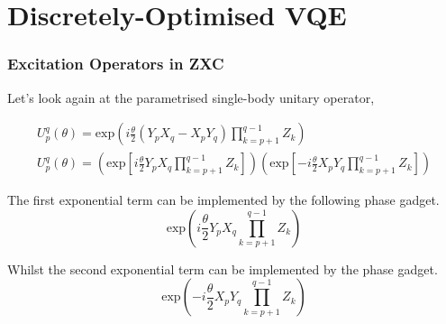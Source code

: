 \section{Discretely-Optimised VQE}

\subsubsection{Excitation Operators in ZXC}

Let's look again at the parametrised single-body unitary operator,

\begin{equation*}
\begin{gathered}
    U^q_p (\theta) =
    \text{exp} \left( i
    \frac{\theta}{2} (Y_p X_q - X_p Y_q) \prod_{k=p+1}^{q-1} Z_k \right) \\
    U^q_p (\theta) =
    \left( \text{exp} \left[
    i \frac{\theta}{2} Y_p X_q \prod_{k=p+1}^{q-1} Z_k \right] \right)
    \left( \text{exp} \left[ -
    i \frac{\theta}{2} X_p Y_q \prod_{k=p+1}^{q-1} Z_k \right] \right)
\end{gathered}
\end{equation*}

The first exponential term can be implemented by the following phase gadget.
\begin{equation*}
    \text{exp} \left( i
    \frac{\theta}{2} Y_p X_q \prod_{k=p+1}^{q-1} Z_k \right)
\end{equation*}





Whilst the second exponential term can be implemented by the phase gadget.
\begin{equation*}
    \text{exp} \left( - i
    \frac{\theta}{2} X_p Y_q \prod_{k=p+1}^{q-1} Z_k \right)
\end{equation*}


